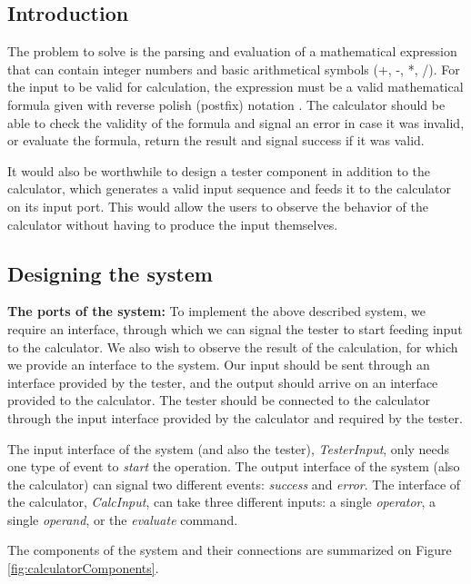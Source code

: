 \subsection{Introduction}
The problem to solve is the parsing and evaluation of a mathematical expression that can contain integer numbers and basic arithmetical symbols (+, -, *, /). For the input to be valid for calculation, the expression must be a valid mathematical formula given with reverse polish (postfix) notation \cite{ParenthesesFreeNotation}. The calculator should be able to check the validity of the formula and signal an error in case it was invalid, or evaluate the formula, return the result and signal success if it was valid. 

It would also be worthwhile to design a tester component in addition to the calculator, which generates a valid input sequence and feeds it to the calculator on its input port. This would allow the users to observe the behavior of the calculator without having to produce the input themselves.
\subsection{Designing the system}
\textbf{The ports of the system:}
To implement the above described system, we require an interface, through which we can signal the tester to start feeding input to the calculator. We also wish to observe the result of the calculation, for which we provide an interface to the system. Our input should be sent through an interface provided by the tester, and the output should arrive on an interface provided to the calculator. The tester should be connected to the calculator through the input interface provided by the calculator and required by the tester. 

The input interface of the system (and also the tester), \textit{TesterInput}, only needs one type of event to \textit{start} the operation. The output interface of the system (also the calculator) can signal two different events: \textit{success} and \textit{error}. The interface of the calculator, \textit{CalcInput}, can take three different inputs: a single \textit{operator}, a single \textit{operand}, or the \textit{evaluate} command.

The components of the system and their connections are summarized on Figure \ref{fig:calculatorComponents}.

